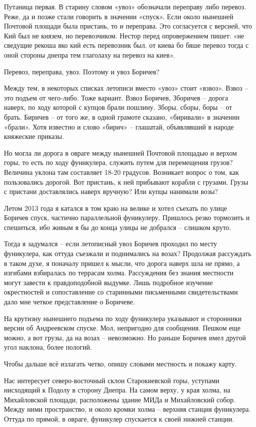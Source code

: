 Путаница первая. В старину словом «увоз» обозначали переправу либо перевоз. Реже, да и позже стали говорить в значении «спуск». Если около нынешней Почтовой площади была пристань, то и переправа. Это согласуется с версией, что Кий был не князем, но перевозчиком. Нестор перед опровержением пишет: «не сведущие рекоша яко кий есть перевозник был. от киева бо бяше перевоз тогда с оной стороны днепра тем глаголаху на перевоз на киев».

Перевоз, переправа, увоз. Поэтому и увоз Боричев?

Между тем, в некоторых списках летописи вместо «увоз» стоит «взвоз». Взвоз – это подъем от чего-либо. Тоже вариант. Взвоз Боричев, Зборичев – дорога наверх, по ходу которой с купцов брали пошлину. Зборы, сборы, боры – от брать. Биричев – от того же, в одной грамоте сказано, «биривали» в значении «брали». Хотя известно и слово «бирич» – глашатай, объявлявший в народе княжеские приказы.

Но могла ли дорога в овраге между нынешней Почтовой площадью и верхом горы, то есть по ходу фуникулера, служить путем для перемещения грузов? Величина уклона там составляет 18-20 градусов. Возникает вопрос о том, как пользовались дорогой. Вот пристань, к ней прибывают корабли с грузами. Грузы с пристани доставлялись наверх вручную? Или купцы нанимали возы?

Летом 2013 года я катался в том краю на велике и хотел съехать по улице Боричев спуск, частично параллельной фуникулеру. Пришлось резко тормозить и спешиться, ибо живым я бы до конца улицы не добрался – слишком круто.

Тогда я задумался – если летописный увоз Боричев проходил по месту фуникулера, как оттуда съезжали и поднимались на возах? Продолжая рассуждать в таком духе, я поначалу пришел к мысли, что дорога наверх шла не прямо, а изгибами взбиралась по террасам холма. Рассуждения без знания местности могут завести к правдоподобной выдумке. Лишь подробное изучение окрестностей и сопоставление со старинными письменными свидетельствами дало мне четкое представление о Боричеве.

На крутизну нынешнего подъема по ходу фуникулера указывают и сторонники версии об Андреевском спуске. Мол, непригодно для сообщения. Пешком еще можно, а вот грузы, да на возах – невозможно. Но раньше Боричев имел другой угол наклона, более пологий.

Чтобы дальше всё излагать четко, опишу словами местность и покажу карту.

Нас интересует северо-восточный склон Старокиевской горы, уступами нисходящий к Подолу в сторону Днепра. На самом верху, у края холма, на Михайловской площади, расположены здание МИДа и Михайловский собор. Между ними пространство, и около кромки холма – верхняя станция фуникулера. Оттуда по прямой, в овраге, фуникулер спускается к своей нижней станции.

